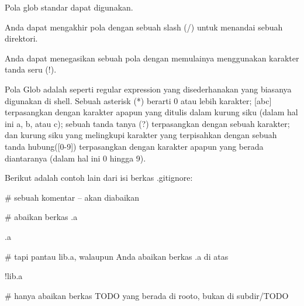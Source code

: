 \noindent 
{\fontsize{14pt}{14pt}\selectfont Pola glob standar dapat digunakan. \\} \par
\noindent 
{\fontsize{14pt}{14pt}\selectfont Anda dapat mengakhir pola dengan sebuah slash (/) untuk menandai sebuah direktori. \\} \par
\noindent 
{\fontsize{14pt}{14pt}\selectfont Anda dapat menegasikan sebuah pola dengan memulainya menggunakan karakter tanda seru (!). \\} \par
\vspace{14pt}
\noindent 
{\fontsize{14pt}{14pt}\selectfont Pola Glob adalah seperti regular expression yang disederhanakan yang biasanya digunakan di shell. Sebuah asterisk (*) berarti 0 atau lebih karakter; $  $[abc] $  $terpasangkan dengan karakter apapun yang ditulis dalam kurung siku (dalam hal ini a, b, atau c); sebuah tanda tanya (?) terpasangkan dengan sebuah karakter; dan kurung siku yang melingkupi karakter yang terpisahkan dengan sebuah tanda hubung([0-9]) terpasangkan dengan karakter apapun yang berada diantaranya (dalam hal ini 0 hingga 9). \\} \par
\vspace{14pt}
\noindent 
{\fontsize{14pt}{14pt}\selectfont Berikut adalah contoh lain dari isi berkas .gitignore: \\} \par
\vspace{14pt}
\noindent 
{\fontsize{14pt}{14pt}\selectfont  $  \#  $ sebuah komentar – akan diabaikan \\} \par
\noindent 
{\fontsize{14pt}{14pt}\selectfont  $  \#  $ abaikan berkas .a \\} \par
\noindent 
{\fontsize{14pt}{14pt}\selectfont *.a \\} \par
\noindent 
{\fontsize{14pt}{14pt}\selectfont  $  \#  $ tapi pantau lib.a, walaupun Anda abaikan berkas .a di atas \\} \par
\noindent 
{\fontsize{14pt}{14pt}\selectfont !lib.a \\} \par
\noindent 
{\fontsize{14pt}{14pt}\selectfont  $  \#  $ hanya abaikan berkas TODO yang berada di rooto, bukan di subdir/TODO \\} \par
